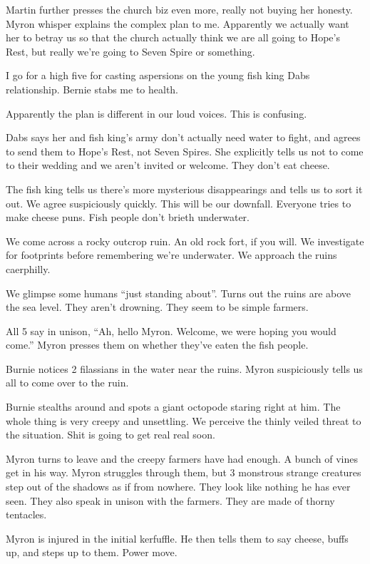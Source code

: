 Martin further presses the church biz even more, really not buying her honesty. Myron whisper explains the complex plan to me. Apparently we actually want her to betray us so that the church actually think we are all going to Hope’s Rest, but really we’re going to Seven Spire or something.\medskip

I go for a high five for casting aspersions on the young fish king Dabs relationship. Bernie stabs me to health.\medskip

Apparently the plan is different in our loud voices. This is confusing.\medskip

Dabs says her and fish king’s army don’t actually need water to fight, and agrees to send them to Hope’s Rest, not Seven Spires. She explicitly tells us not to come to their wedding and we aren’t invited or welcome. They don’t eat cheese.\medskip

The fish king tells us there’s more mysterious disappearings and tells us to sort it out. We agree suspiciously quickly. This will be our downfall. Everyone tries to make cheese puns. Fish people don’t brieth underwater.\medskip

We come across a rocky outcrop ruin. An old rock fort, if you will. We investigate for footprints before remembering we’re underwater. We approach the ruins caerphilly.\medskip

We glimpse some humans “just standing about”. Turns out the ruins are above the sea level. They aren’t drowning. They seem to be simple farmers.\medskip

All 5 say in unison, “Ah, hello Myron. Welcome, we were hoping you would come.” Myron presses them on whether they’ve eaten the fish people.\medskip

Burnie notices 2 filassians in the water near the ruins. Myron suspiciously tells us all to come over to the ruin.\medskip

Burnie stealths around and spots a giant octopode staring right at him. The whole thing is very creepy and unsettling. We perceive the thinly veiled threat to the situation. Shit is going to get real real soon.\medskip

Myron turns to leave and the creepy farmers have had enough. A bunch of vines get in his way. Myron struggles through them, but 3 monstrous strange creatures step out of the shadows as if from nowhere. They look like nothing he has ever seen. They also speak in unison with the farmers. They are made of thorny tentacles.\medskip

Myron is injured in the initial kerfuffle. He then tells them to say cheese, buffs up, and steps up to them. Power move.\medskip


